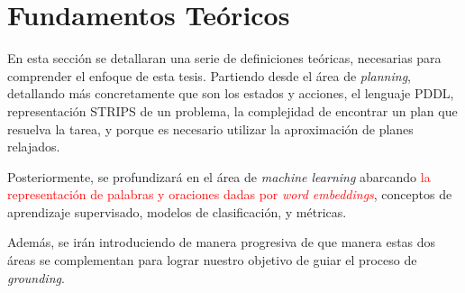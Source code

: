 \chapter{Fundamentos Teóricos}
\label{ch:lit_rev}

En esta sección se detallaran una serie de definiciones teóricas, necesarias
para comprender el enfoque de esta tesis. Partiendo desde el área de
\emph{planning}, detallando más concretamente que son los estados y acciones, el
lenguaje PDDL, representación STRIPS de un problema, la complejidad de encontrar
un plan que resuelva la tarea, y porque es necesario utilizar la aproximación de
planes relajados.

Posteriormente, se profundizará en el área de \emph{machine learning} abarcando
\textcolor{red}{la representación de palabras y oraciones dadas por \emph{word embeddings}},
conceptos de aprendizaje supervisado, modelos de clasificación, y métricas.

Además, se irán introduciendo de manera progresiva de que manera estas dos áreas
se complementan para lograr nuestro objetivo de guiar el proceso de
\emph{grounding}.

\section{} 
